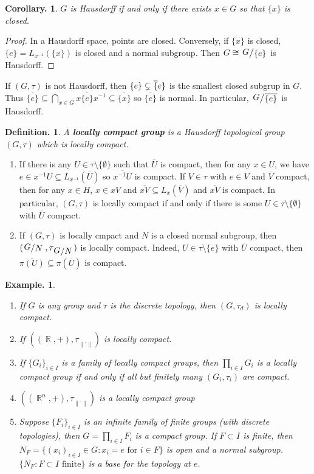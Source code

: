 \documentclass[11pt, a4paper]{memoir}
\DeclareMathOperator{\R}{{\mathbb{R}}}
\newcommand{\norm}[1]{\ensuremath{\left\lVert#1\right\rVert}}
\theoremstyle{change}
\newtheorem{corollary}[theorem]{Corollary.}
\theoremstyle{plain}
\theoremstyle{nonumberplain}
\newtheorem{definition}{Definition.}
\newtheorem{example}{Example.}
\newtheorem{proof}{Proof}
\newcommand{\quot}[2]{\mathchoice{\left.\raisebox{0.14em}{$#1$}\middle/\raisebox{-0.14em}{$#2$}\right.}
                                 {\left.\raisebox{0.08em}{$#1$}\middle/\raisebox{-0.08em}{$#2$}\right.}
                                 {\left.\raisebox{0.03em}{$#1$}\middle/\raisebox{-0.03em}{$#2$}\right.}
                                 {\left.\raisebox{0em}{$#1$}\middle/\raisebox{0em}{$#2$}\right.}}
\newcommand{\defn}[1]{{\boldmath\bfseries #1}}
\numberwithin{equation}{section}
\begin{document}
\begin{corollary}
    $G$ is Hausdorff if and only if there exists $x\in G$ so that $\{x\}$ is closed.
\end{corollary}
\begin{proof}
    In a Hausdorff space, points are closed.
    Conversely, if $\{x\}$ is closed, $\{e\}=L_{x^{-1}}(\{x\})$ is closed and a normal subgroup.
    Then $G\cong\quot{G}{\{e\}}$ is Hausdorff.
\end{proof}
If $(G,\tau)$ is not Hausdorff, then $\{e\}\subsetneq\overline\{e\}$ is the smallest closed subgrup in $G$.
Thus $\overline{\{e\}}\subseteq\bigcap_{x\in G}x\overline{\{e\}}x^{-1}\subseteq\overline{\{x\}}$ so $\overline{\{e\}}$ is normal.
In particular, $\quot{G}{\overline{\{e\}}}$ is Hausdorff.
\begin{definition}
    A \defn{locally compact group} is a Hausdorff topological group $(G,\tau)$ which is locally compact.
\end{definition}
\begin{enumerate}[nl,r]
    \item If there is any $U\in\tau\setminus\{\emptyset\}$ such that $\overline{U}$ is compact, then for any $x\in U$, we have $e\in x^{-1}U\subseteq L_{x^{-1}}(\overline{U})$ so $\overline{x^{-1}U}$ is compact.
        If $V\in\tau$ with $e\in V$ and $\overline{V}$ compact, then for any $x\in H$, $x\in xV$ and $\overline{xV}\subseteq L_x(\overline{V})$ and $\overline{xV}$ is compact.
        In particular, $(G,\tau)$ is locally compact if and only if there is some $U\in\tau\setminus\{\emptyset\}$ with $\overline{U}$ compact.
    \item If $(G,\tau)$ is locally cmpact and $N$ is a closed normal subgroup, then $(\quot{G}{N},\tau_{\quot{G}{N}})$ is locally compact.
        Indeed, $U\in\tau\setminus\{e\}$ with $\overline{U}$ compact, then $\overline{\pi(U)}\subseteq\pi(\overline{U})$ is compact.
\end{enumerate}
\begin{example}
    \begin{enumerate}[nl,r]
        \item If $G$ is any group and $\tau$ is the discrete topology, then $(G,\tau_d)$ is locally compact.
        \item If $((\R,+),\tau_{\norm{\cdot}})$ is locally compact.
        \item If $\{G_i\}_{i\in I}$ is a family of locally compact groups, then $\prod_{i\in I}G_i$ is a locally compact group if and only if all but finitely many $(G_i,\tau_i)$ are compact.
        \item $((\R^n,+),\tau_{\norm{\cdot}})$ is a locally compact group
        \item Suppose $\{F_i\}_{i\in I}$ is an infinite family of finite groups (with discrete topologies), then $G=\prod_{i\in I}F_i$ is a compact group.
            If $F\subset I$ is finite, then $N_F=\{(x_i)_{i\in I}\in G:x_i=e\text{ for }i\in F\}$ is open and a normal subgroup.
            $\{N_F:F\subset I\text{ finite}\}$ is a base for the topology at $e$.
    \end{enumerate}
\end{example}
\end{document}
